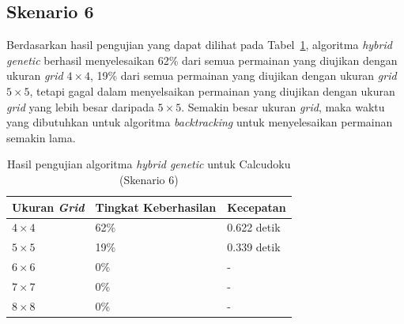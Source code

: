 \subsection{Skenario 6}
\label{sec:skenario6}

Berdasarkan hasil pengujian yang dapat dilihat pada Tabel~\ref{tab:pengujianhg6}, algoritma \textit{hybrid genetic} berhasil menyelesaikan 62\% dari semua permainan yang diujikan dengan ukuran \textit{grid} \begin{math}4 \times 4\end{math}, 19\% dari semua permainan yang diujikan dengan ukuran \textit{grid} \begin{math}5 \times 5\end{math}, tetapi gagal dalam menyelsaikan permainan yang diujikan dengan ukuran \textit{grid} yang lebih besar daripada \begin{math}5 \times 5\end{math}. Semakin besar ukuran \textit{grid}, maka waktu yang dibutuhkan untuk algoritma \textit{backtracking} untuk menyelesaikan permainan semakin lama.

\begin{table}
\centering
\captionsetup{justification=centering}
\caption[Hasil pengujian algoritma \textit{hybrid genetic} untuk Calcudoku (Skenario 6)]{Hasil pengujian algoritma \textit{hybrid genetic} untuk Calcudoku (Skenario 6)}
\begin{tabular}{| l | l | l |}
\hline
Ukuran \textit{Grid} & Tingkat Keberhasilan & Kecepatan \\
\hline \hline
\begin{math}4 \times 4\end{math} & 62\% & 0.622 detik \\
\hline
\begin{math}5 \times 5\end{math} & 19\% & 0.339 detik \\
\hline
\begin{math}6 \times 6\end{math} & 0\% & - \\
\hline
\begin{math}7 \times 7\end{math} & 0\% & - \\
\hline
\begin{math}8 \times 8\end{math} & 0\% & - \\
\hline
\end{tabular}
\label{tab:pengujianhg6}
\end{table}

